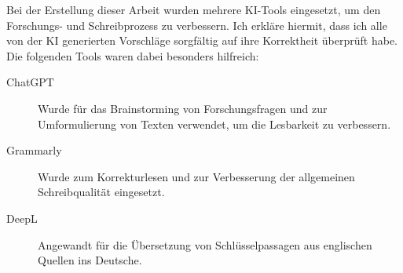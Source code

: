 Bei der Erstellung dieser Arbeit wurden mehrere KI-Tools eingesetzt, um den Forschungs- und Schreibprozess zu verbessern.
Ich erkläre hiermit, dass ich alle von der KI generierten Vorschläge sorgfältig auf ihre Korrektheit überprüft habe.
Die folgenden Tools waren dabei besonders hilfreich:

\begin{description}
    \item[ChatGPT] Wurde für das Brainstorming von Forschungsfragen und zur Umformulierung von Texten verwendet, um die Lesbarkeit zu verbessern.
    \item[Grammarly] Wurde zum Korrekturlesen und zur Verbesserung der allgemeinen Schreibqualität eingesetzt.
    \item[DeepL] Angewandt für die Übersetzung von Schlüsselpassagen aus englischen Quellen ins Deutsche.
\end{description}


